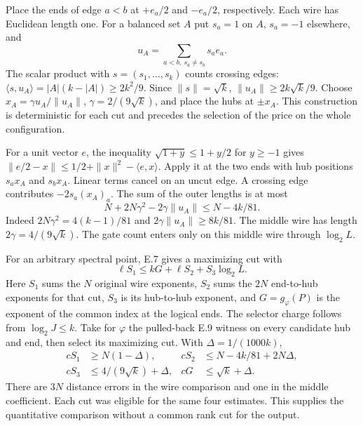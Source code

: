 \clearpage
{}
Place the ends of edge $a<b$ at $+e_a/2$ and $-e_a/2$, respectively. Each wire has Euclidean length one. For a balanced set $A$ put $s_a=1$ on $A$, $s_a=-1$ elsewhere, and
\[
 u_A=\sum_{a<b,\ s_a\ne s_b}s_a e_a .
\]
The scalar product with $s=(s_1,\ldots,s_k)$ counts crossing edges: $\langle s,u_A\rangle=|A|(k-|A|)\ge2k^2/9$. Since $\|s\|=\sqrt{k}$, $\|u_A\|\ge2k\sqrt{k}/9$. Choose $x_A=\gamma u_A/\|u_A\|$, $\gamma=2/(9\sqrt{k})$, and place the hubs at $\pm x_A$. This construction is deterministic for each cut and precedes the selection of the price on the whole configuration.

For a unit vector $e$, the inequality $\sqrt{1+y}\le1+y/2$ for $y\ge-1$ gives $\|e/2-x\|\le1/2+\|x\|^2-\langle e,x\rangle$. Apply it at the two ends with hub positions $s_a x_A$ and $s_b x_A$. Linear terms cancel on an uncut edge. A crossing edge contributes $-2s_a(x_A)_a$. The sum of the outer lengths is at most
\[
 N+2N\gamma^2-2\gamma\|u_A\|\le N-4k/81 .
\]
Indeed $2N\gamma^2=4(k-1)/81$ and $2\gamma\|u_A\|\ge8k/81$. The middle wire has length $2\gamma=4/(9\sqrt k)$. The gate count enters only on this middle wire through $\log_2 L$.

For an arbitrary spectral point, E.7 gives a maximizing cut with
\[
 \ell S_1\le kG+\ell S_2+S_3\log_2 L .
\]
Here $S_1$ sums the $N$ original wire exponents, $S_2$ sums the $2N$ end-to-hub exponents for that cut, $S_3$ is its hub-to-hub exponent, and $G=g_\varphi(P)$ is the exponent of the common index at the logical ends. The selector charge follows from $\log_2J\le k$. Take for $\varphi$ the pulled-back E.9 witness on every candidate hub and end, then select its maximizing cut. With $\Delta=1/(1000k)$,
\begin{align*}
 cS_1&\ge N(1-\Delta),&
 cS_2&\le N-4k/81+2N\Delta,\\
 cS_3&\le4/(9\sqrt k)+\Delta,&
 cG&\le\sqrt k+\Delta .
\end{align*}
There are $3N$ distance errors in the wire comparison and one in the middle coefficient. Each cut was eligible for the same four estimates. This supplies the quantitative comparison without a common rank cut for the output.

